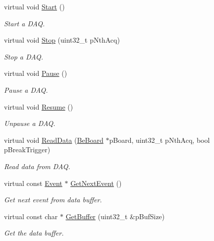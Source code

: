 \begin{DoxyCompactItemize}
virtual void \hyperlink{class_ph2___hw_interface_1_1_be_board_f_w_interface_a2835dae7ec6788c1d5728e53f9c3051a}{Start} ()
\begin{DoxyCompactList}\small\item\em Start a D\-A\-Q. \end{DoxyCompactList}\item 
virtual void \hyperlink{class_ph2___hw_interface_1_1_be_board_f_w_interface_af7825e291796f7c8c498a92365583e08}{Stop} (uint32\-\_\-t p\-Nth\-Acq)
\begin{DoxyCompactList}\small\item\em Stop a D\-A\-Q. \end{DoxyCompactList}\item 
virtual void \hyperlink{class_ph2___hw_interface_1_1_be_board_f_w_interface_afb21d1663b328272c12cab6970114ecd}{Pause} ()
\begin{DoxyCompactList}\small\item\em Pause a D\-A\-Q. \end{DoxyCompactList}\item 
virtual void \hyperlink{class_ph2___hw_interface_1_1_be_board_f_w_interface_aafa48fcae2c37040141afc89113881e5}{Resume} ()
\begin{DoxyCompactList}\small\item\em Unpause a D\-A\-Q. \end{DoxyCompactList}\item 
virtual void \hyperlink{class_ph2___hw_interface_1_1_be_board_f_w_interface_af27f2a01b7625d2b144760413128acf2}{Read\-Data} (\hyperlink{class_ph2___hw_description_1_1_be_board}{Be\-Board} $\ast$p\-Board, uint32\-\_\-t p\-Nth\-Acq, bool p\-Break\-Trigger)
\begin{DoxyCompactList}\small\item\em Read data from D\-A\-Q. \end{DoxyCompactList}\item 
virtual const \hyperlink{class_ph2___hw_interface_1_1_event}{Event} $\ast$ \hyperlink{class_ph2___hw_interface_1_1_be_board_f_w_interface_a5f524d2a377db09667de71563e0fab3d}{Get\-Next\-Event} ()
\begin{DoxyCompactList}\small\item\em Get next event from data buffer. \end{DoxyCompactList}\item 
virtual const char $\ast$ \hyperlink{class_ph2___hw_interface_1_1_be_board_f_w_interface_aa298116ba4220d37f3eabfd57b0310c7}{Get\-Buffer} (uint32\-\_\-t \&p\-Buf\-Size)
\begin{DoxyCompactList}\small\item\em Get the data buffer. \end{DoxyCompactList}\end{DoxyCompactItemize}
